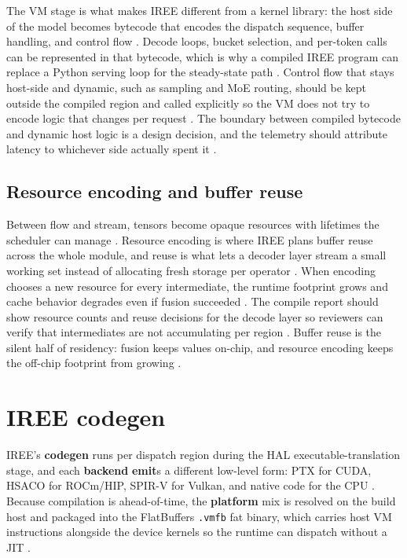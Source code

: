 The VM stage is what makes IREE different from a kernel library: the host side of the model becomes bytecode that encodes the dispatch sequence, buffer handling, and control flow \citep{iree2024}. Decode loops, bucket selection, and per-token calls can be represented in that bytecode, which is why a compiled IREE program can replace a Python serving loop for the steady-state path \citep{taxbreak2026,patel2025llminference}. Control flow that stays host-side and dynamic, such as sampling and MoE routing, should be kept outside the compiled region and called explicitly so the VM does not try to encode logic that changes per request \citep{kwon2023vllm,liu2024deepseekv3}. The boundary between compiled bytecode and dynamic host logic is a design decision, and the telemetry should attribute latency to whichever side actually spent it \citep{memoryfloor2026,chen2020compilerbasedhardw}.

\subsection{Resource encoding and buffer reuse}

Between flow and stream, tensors become opaque resources with lifetimes the scheduler can manage \citep{iree2024,chen2020compilerbasedhardw}. Resource encoding is where IREE plans buffer reuse across the whole module, and reuse is what lets a decoder layer stream a small working set instead of allocating fresh storage per operator \citep{memoryfloor2026,iree2024}. When encoding chooses a new resource for every intermediate, the runtime footprint grows and cache behavior degrades even if fusion succeeded \citep{patel2025llminference,memoryfloor2026}. The compile report should show resource counts and reuse decisions for the decode layer so reviewers can verify that intermediates are not accumulating per region \citep{chen2020compilerbasedhardw,taxbreak2026}. Buffer reuse is the silent half of residency: fusion keeps values on-chip, and resource encoding keeps the off-chip footprint from growing \citep{memoryfloor2026,iree2024}.

\section{IREE codegen}
\label{sec:ch18_iree_codegen}

IREE's \textbf{codegen} runs per dispatch region during the HAL executable-translation stage, and each \textbf{backend} \textbf{emit}s a different low-level form: PTX for CUDA, HSACO for ROCm/HIP, SPIR-V for Vulkan, and native code for the CPU \citep{iree2024}. Because compilation is ahead-of-time, the \textbf{platform} mix is resolved on the build host and packaged into the FlatBuffers \texttt{.vmfb} fat binary, which carries host VM instructions alongside the device kernels so the runtime can dispatch without a JIT \citep{iree2024}.

